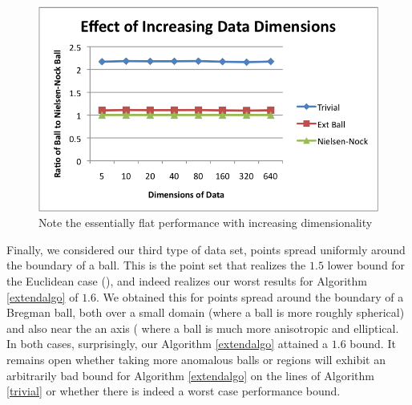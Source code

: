 \documentclass[11pt]{myclass}
\begin{document}
\begin{figure}[H]
  \begin{center}
    \includegraphics[scale = 0.8]{../figures/inc_dimensions.png}
  \end{center}
  \caption{Note the essentially flat performance with increasing dimensionality }
  \label{incdim}
\end{figure}

Finally, we considered our third type of data set, points spread uniformly around the boundary of a ball. This is the point set that realizes the $1.5$ lower bound for the Euclidean case (\cite{onepointfive}), and indeed realizes our worst results for Algorithm \ref{extendalgo} of $1.6$. We obtained this for points spread around the boundary of a Bregman ball, both over a small domain (where a ball is more roughly spherical) and also near the an axis ( where a ball is much more anisotropic and elliptical. In both cases, surprisingly, our Algorithm \ref{extendalgo} attained a $1.6$ bound. It remains open whether taking more anomalous balls 
or regions will exhibit an arbitrarily bad bound for Algorithm \ref{extendalgo} on the lines of Algorithm \ref{trivial} or whether
there is indeed a worst case performance bound.
\end{document}
